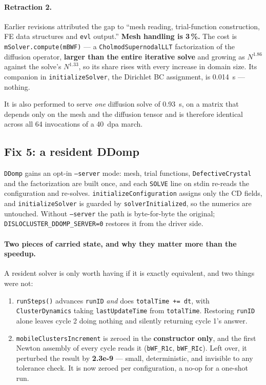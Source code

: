\documentclass[11pt]{article}
\begin{document}
\paragraph{Retraction 2.} Earlier revisions attributed the gap to ``mesh
reading, trial-function construction, FE data structures and \texttt{evl}
output.'' \textbf{Mesh handling is 3\,\%.} The cost is
\texttt{mSolver.compute(mBWF)} --- a \texttt{CholmodSupernodalLLT}
factorization of the diffusion operator, \textbf{larger than the entire
iterative solve} and growing as $N^{1.86}$ against the solve's $N^{1.33}$, so
its share rises with every increase in domain size. Its companion in
\texttt{initializeSolver}, the Dirichlet BC assignment, is
\SI{0.014}{\second} --- nothing.

It is also performed to serve \emph{one} diffusion solve of
\SI{0.93}{\second}, on a matrix that depends only on the mesh and the diffusion
tensor and is therefore identical across all 64 invocations of a
\SI{40}{dpa} march.

\subsection{Fix 5: a resident DDomp}
\texttt{DDomp} gains an opt-in \texttt{--server} mode: mesh, trial functions,
\texttt{DefectiveCrystal} and the factorization are built once, and each
\texttt{SOLVE} line on stdin re-reads the configuration and re-solves.
\texttt{initializeConfiguration} assigns only the CD fields, and
\texttt{initializeSolver} is guarded by \texttt{solverInitialized}, so the
numerics are untouched. Without \texttt{--server} the path is byte-for-byte the
original; \texttt{DISLOCLUSTER\_DDOMP\_SERVER=0} restores it from the driver
side.

\paragraph{Two pieces of carried state, and why they matter more than the
speedup.} A resident solver is only worth having if it is exactly equivalent,
and two things were not:

\begin{enumerate}
  \item \texttt{runSteps()} advances \texttt{runID} \emph{and} does
        \texttt{totalTime += dt}, with \texttt{ClusterDynamics} taking
        \texttt{lastUpdateTime} from \texttt{totalTime}. Restoring
        \texttt{runID} alone leaves cycle 2 doing nothing and silently
        returning cycle 1's answer.
  \item \texttt{mobileClustersIncrement} is zeroed in the \textbf{constructor
        only}, and the first Newton assembly of every cycle reads it
        (\texttt{bWF\_R1c}, \texttt{bWF\_RIc}). Left over, it perturbed the
        result by \textbf{2.3e-9} --- small, deterministic, and invisible to any
        tolerance check. It is now zeroed per configuration, a no-op for a
        one-shot run.
\end{enumerate}
\end{document}

